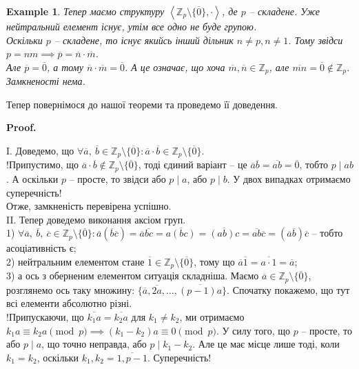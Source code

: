 \documentclass[a4paper, 10pt]{article}
\makeatletter
\theoremstyle{theoremdd}
\theoremstyle{theoremdd}
\theoremstyle{theoremdd}
\theoremstyle{theoremdd}
\theoremstyle{theoremdd}
\newtheorem{example}[theorem]{Example}
\theoremstyle{theoremdd}
\theoremstyle{theoremdd}
\theoremstyle{theoremdd}
\theoremstyle{theoremdd}
\theoremstyle{theoremdd}
\theoremstyle{theoremdd}
\theoremstyle{theoremdd}
\theoremstyle{theoremdd}
\theoremstyle{theoremdd}
\theoremstyle{theoremdd}
\renewenvironment{proof}[1][Proof.\\]{\par
\pushQED{\hfill \qed}%
\normalfont \topsep6\p@\@plus6\p@\relax
\trivlist
\item\relax
{\bfseries
#1\@addpunct{.}}\hspace\labelsep\ignorespaces
}{%
\popQED\endtrivlist\@endpefalse
}
\makeatother
\begin{document}
\begin{example}
Тепер маємо структуру $\left<\mathbb{Z}_p \setminus \{\overline{0}\}, \cdot \right>$, де $p$ -- складене. Уже нейтральний елемент існує, утім все одно не буде групою.\\
Оскільки $p$ -- складене, то існує якийсь інший дільник $n \neq p, n \neq 1$. Тому звідси $p = nm \implies \overline{p} = \overline{n} \cdot \overline{m}$.\\
Але $\overline{p} = \overline{0}$, а тому $\overline{n}\cdot \overline{m} = \overline{0}$. А це означає, що хоча $\overline{m}, \overline{n} \in \mathbb{Z}_p$, але $\overline{mn} = \overline{0} \not\in \mathbb{Z}_p$. Замкненості нема.
\end{example}

Тепер повернімося до нашої теореми та проведемо її доведення.
\begin{proof}
I. Доведемо, що $\forall \overline{a},\ \overline{b} \in \mathbb{Z}_p \setminus \{ \overline{0}\}: \overline{a} \cdot \overline{b} \in \mathbb{Z}_p \setminus \{ \overline{0}\}$.\\
!Припустимо, що $\overline{a} \cdot \overline{b} \not\in \mathbb{Z}_p \setminus \{ \overline{0}\}$, тоді єдиний варіант -- це $\overline{a} \overline{b} = \overline{ab} = \overline{0}$, тобто $p \mid ab$. А оскільки $p$ -- просте, то звідси або $p \mid a$, або $p \mid b$. У двох випадках отримаємо суперечність!\\
Отже, замкненість перевірена успішно.
\bigskip \\
II. Тепер доведемо виконання аксіом груп.\\
1) $\forall \overline{a},\ \overline{b},\ \overline{c} \in \mathbb{Z}_p \setminus \{ \overline{0}\}: \overline{a}(\overline{b}\overline{c}) = \overline{a}\overline{bc} = \overline{a(bc)} = \overline{(ab)c} = \overline{ab} \overline{c} = (\overline{a}\overline{b})\overline{c}$ -- тобто асоціативність є;\\
2) нейтральним елементом стане $\overline{1} \in \mathbb{Z}_p \setminus \{ \overline{0}\}$, тому що $\overline{a} \overline{1} = \overline{a \cdot 1} = \overline{a}$;\\
3) а ось з оберненим елементом ситуація складніша. Маємо $\overline{a} \in \mathbb{Z}_p \setminus \{ \overline{0}\}$, розглянемо ось таку множину: $\{\overline{a}, \overline{2a}, \dots, \overline{(p-1)a} \}$. Спочатку покажемо, що тут всі елементи абсолютно різні. \\
!Припускаючи, що $\overline{k_1 a} = \overline{k_2 a}$ для $k_1 \neq k_2$, ми отримаємо $k_1 a \equiv k_2 a \pmod p \implies (k_1-k_2)a \equiv 0 \pmod p$. У силу того, що $p$ -- просте, то або $p \mid a$, що точно неправда, або $p \mid k_1-k_2$. Але це має місце лише тоді, коли $k_1 = k_2$, оскільки $k_1,k_2 = \overline{1,p-1}$. Суперечність!\\

\end{proof}
\end{document}
